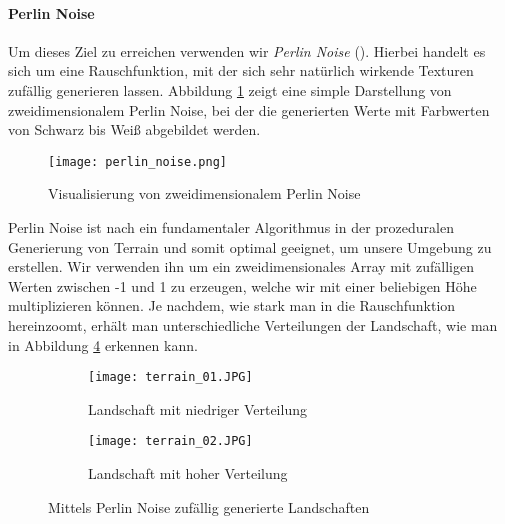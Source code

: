 \paragraph{Perlin Noise}
Um dieses Ziel zu erreichen verwenden wir \textit{Perlin Noise} (\cite{parberry2015modeling}). Hierbei handelt es sich um eine Rauschfunktion, mit der sich sehr natürlich wirkende Texturen zufällig generieren lassen. Abbildung \ref{img:perlinNoise} zeigt eine simple Darstellung von zweidimensionalem Perlin Noise, bei der die generierten Werte mit Farbwerten von Schwarz bis Weiß abgebildet werden.
\begin{figure}[h!]
    \centering
    \texttt{[image: perlin\_noise.png]}
    \caption{Visualisierung von zweidimensionalem Perlin Noise} \label{img:perlinNoise}
\end{figure}
% 
Perlin Noise ist nach \cite{parberry2015modeling} ein fundamentaler Algorithmus in der prozeduralen Generierung von Terrain und somit optimal geeignet, um unsere Umgebung zu erstellen. Wir verwenden ihn um ein zweidimensionales Array mit zufälligen Werten zwischen -1 und 1 zu erzeugen, welche wir mit einer beliebigen Höhe multiplizieren können. Je nachdem, wie stark man in die Rauschfunktion \glqq hereinzoomt\grqq{}, erhält man unterschiedliche Verteilungen der Landschaft, wie man in Abbildung \ref{img:randomTerrain} erkennen kann.
\begin{figure}[h!]
    \centering
    \begin{subfigure}[b]{0.49\textwidth}
        \texttt{[image: terrain\_01.JPG]}
        \caption{Landschaft mit niedriger Verteilung}
        \label{img:randomTerrainA}
    \end{subfigure}
    \begin{subfigure}[b]{0.49\textwidth}
        \texttt{[image: terrain\_02.JPG]}
        \caption{Landschaft mit hoher Verteilung}
        \label{img:randomTerrainB}
    \end{subfigure}
    \caption{Mittels Perlin Noise zufällig generierte Landschaften}
    \label{img:randomTerrain}
\end{figure}

